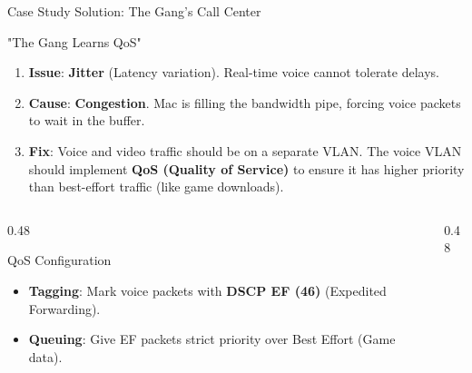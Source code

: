 \documentclass[aspectratio=169]{beamer}  %
\begin{document}
\begin{frame}{Case Study Solution: The Gang's Call Center}
    \begin{casesolution}{"The Gang Learns QoS"}
        \small
        \begin{enumerate}
            \item \textbf{Issue}: \textbf{Jitter} (Latency variation). Real-time voice cannot tolerate delays.
            \item \textbf{Cause}: \textbf{Congestion}. Mac is filling the bandwidth pipe, forcing voice packets to wait in the buffer.
            \item \textbf{Fix}: Voice and video traffic should be on a separate VLAN. The voice VLAN should implement \textbf{QoS (Quality of Service)} to ensure it has higher priority than best-effort traffic (like game downloads).
        \end{enumerate}
    \end{casesolution}
    
    \begin{columns}[T]
        \begin{column}{0.48\textwidth}
            \begin{block}{QoS Configuration}
                \small
                \begin{itemize}
                    \item \textbf{Tagging}: Mark voice packets with \textbf{DSCP EF (46)} (Expedited Forwarding).
                    \item \textbf{Queuing}: Give EF packets strict priority over Best Effort (Game data).
                \end{itemize}
            \end{block}
        \end{column}
        \begin{column}{0.48\textwidth}
            \begin{center}
\end{center}
\end{column}
\end{columns}
\end{frame}
\end{document}

